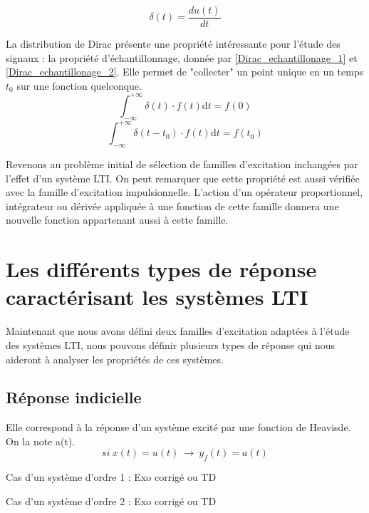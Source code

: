 \documentclass[]{report}
\newcommand{\deriv}{\mathrm{d}}
\begin{document}
	
	\begin{equation}\label{Dirac}
	\delta (t) = \frac{du(t)}{dt}	 	
	\end{equation}
	
	La distribution de Dirac présente une propriété intéressante pour l'étude des signaux : la propriété d'échantillonnage, donnée par \ref{Dirac_echantillonage_1} et \ref{Dirac_echantillonage_2}. Elle permet de "collecter" un point unique en un temps  $t_{0}$ sur une fonction quelconque.
	\begin{equation}\label{Dirac_echantillonage_1}
	\int_{-\infty}^{+\infty} \delta (t) \cdot f(t) \deriv t = f(0) 	 
	\end{equation}
	\begin{equation}\label{Dirac_echantillonage_2} 	
	\int_{-\infty}^{+\infty} \delta (t-t_{0}) \cdot f(t) \deriv t = f(t_{0}) 
	\end{equation}
	
	\vspace{0.5\baselineskip}
	Revenons au problème initial de sélection de familles d'excitation inchangées par l'effet d'un système LTI. On peut remarquer que cette propriété est aussi vérifiée avec la famille d'excitation impulsionnelle. L'action d'un opérateur proportionnel, intégrateur ou dérivée appliquée à une fonction de cette famille donnera une nouvelle fonction appartenant aussi à cette famille.
	
	
	\section{Les différents types de réponse caractérisant les systèmes LTI}
	Maintenant que nous avons défini deux familles d'excitation adaptées à l'étude des systèmes LTI, nous pouvons définir plusieurs types de réponse qui nous aideront à analyser les propriétés de ces systèmes.
	\subsection{Réponse indicielle}
	Elle correspond à la réponse d'un système excité par une fonction de Heavisde. On la note a(t).
	\begin{equation}\label{key}
	si~x(t)=u(t)~\rightarrow ~y_{f}(t)=a(t)
	\end{equation}
	
	
	Cas d'un système d'ordre 1 : Exo corrigé ou TD
	
	Cas d'un système d'ordre 2 : Exo corrigé ou TD
	
	
\end{document}
